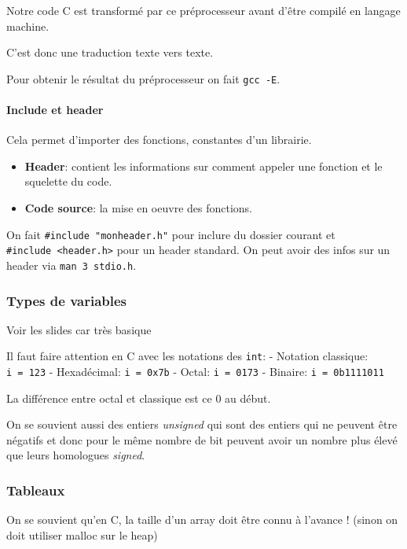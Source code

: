 Notre code C est transformé par ce préprocesseur avant d'être compilé en
langage machine.

C'est donc une traduction texte vers texte.

Pour obtenir le résultat du préprocesseur on fait \texttt{gcc\ -E}.

\paragraph{Include et header}\label{include-et-header}

Cela permet d'importer des fonctions, constantes d'un librairie.

\begin{itemize}
\tightlist
\item
  \textbf{Header}: contient les informations sur comment appeler une
  fonction et le squelette du code.
\item
  \textbf{Code source}: la mise en oeuvre des fonctions.
\end{itemize}

On fait \texttt{\#include\ "monheader.h"} pour inclure du dossier
courant et \texttt{\#include\ \textless{}header.h\textgreater{}} pour un
header standard. On peut avoir des infos sur un header via
\texttt{man\ 3\ stdio.h}.

\subsubsection{Types de variables}\label{types-de-variables}

Voir les slides car très basique

Il faut faire attention en C avec les notations des \texttt{int}: -
Notation classique: \texttt{i\ =\ 123} - Hexadécimal:
\texttt{i\ =\ 0x7b} - Octal: \texttt{i\ =\ 0173} - Binaire:
\texttt{i\ =\ 0b1111011}

La différence entre octal et classique est ce 0 au début.

On se souvient aussi des entiers \emph{unsigned} qui sont des entiers
qui ne peuvent être négatifs et donc pour le même nombre de bit peuvent
avoir un nombre plus élevé que leurs homologues \emph{signed}.

\subsubsection{Tableaux}\label{tableaux}

On se souvient qu'en C, la taille d'un array doit être connu à l'avance
! (sinon on doit utiliser malloc sur le heap)


